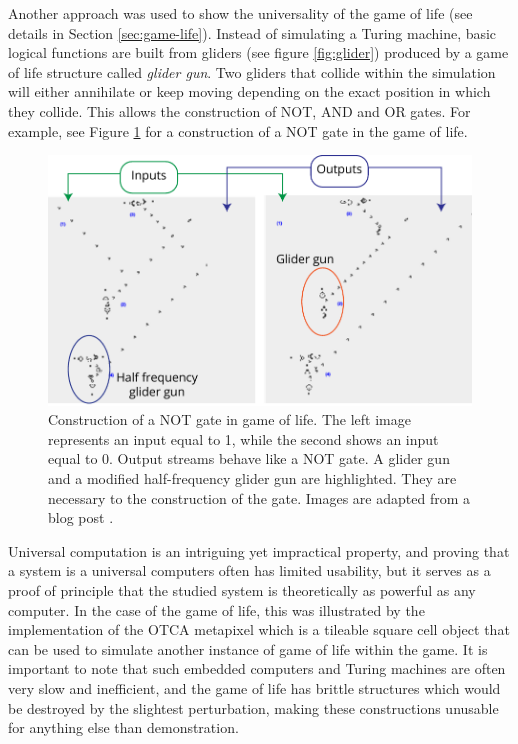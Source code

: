 Another approach was used to show the universality of the game of life (see
details in Section \ref{sec:game-life}). Instead of simulating a Turing machine,
basic logical functions are built from gliders (see figure \ref{fig:glider})
produced by a game of life structure called \emph{glider gun}. Two gliders that
collide within the simulation will either annihilate or keep moving depending on
the exact position in which they collide. This allows the construction of NOT, AND and
OR gates. For example, see Figure \ref{fig:gol_not_gate} for a construction of a
NOT gate in the game of life.

\begin{figure}[htbp]
  \centering
  \includegraphics[width=.8\linewidth]{figures/gol_not_gate}
  \caption{Construction of a NOT gate in game of life. The left image represents
    an input equal to 1, while the second shows an input equal to 0. Output
    streams behave like a NOT gate. A glider gun and a modified half-frequency
    glider gun are highlighted. They are necessary to the construction of the
    gate. Images are adapted from a blog post
    \parencite{carliniDigitalLogicGates2020}.}
  \label{fig:gol_not_gate}
\end{figure}

Universal computation is an intriguing yet impractical property, and proving
that a system is a universal computers often has limited usability, but it
serves as a proof of principle that the studied system is theoretically as
powerful as any computer. In the case of the game of life, this was illustrated
by the implementation of the OTCA metapixel which is a tileable square cell
object that can be used to simulate another instance of game of life within the
game. It is important to note that such embedded computers and Turing machines
are often very slow and inefficient, and the game of life has brittle structures
which would be destroyed by the slightest perturbation, making these
constructions unusable for anything else than demonstration.

